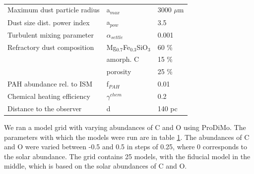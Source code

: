 \documentclass[twoside, single, authoryear, semicolon]{lion-msc}
\newcommand{\3}{$_3$}
\newcommand{\2}{$_2$}
\begin{document}
\begin{table}[!h]
\begin{tabular}{@{}lll@{}}
Maximum dust particle radius      & a$_{max}$                   & 3000 $\mu$m                \\
Dust size dist. power index       & a$_{pow}$                   & 3.5                        \\
Turbulent mixing parameter        & $\alpha_{settle}$           & 0.001                      \\
Refractory dust composition       & Mg$_{0.7}$Fe$_{0.3}$SiO\3 & 60 \%                      \\
                                  & amorph. C                   & 15 \%                      \\
                                  & porosity                    & 25 \%                      \\
PAH abundance rel. to ISM         & f$_{PAH}$                   & 0.01                       \\
Chemical heating efficiency       & $\gamma^{chem}$             & 0.2                        \\ \midrule
Distance to the observer          & d                           & 140 pc                     \\ \bottomrule
\end{tabular}
\caption{}
\label{tab:parameters}
\end{table}

We ran a model grid with varying abundances of C and O using ProDiMo. The parameters with which the models were run are in table \ref{tab:parameters}. The abundances of C and O were varied between -0.5 and 0.5 in steps of 0.25, where 0 corresponds to the solar abundance. The grid contains 25 models, with the fiducial model in the middle, which is based on the solar abundances of C and O.
\end{document}
